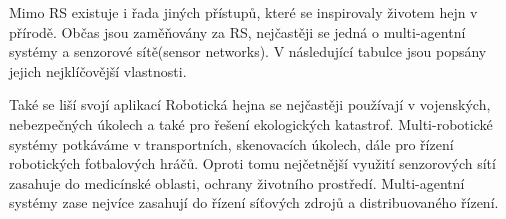 \par 
Mimo RS existuje i řada jiných přístupů, které se inspirovaly životem hejn v přírodě. Občas jsou zaměňovány za RS, nejčastěji se jedná o multi-agentní systémy a senzorové sítě(sensor networks). V následující tabulce jsou popsány jejich nejklíčovější vlastnosti. \par
\begin{center}
    \begin{table} 
    \end{table}
    \end{center}
    Také se liší svojí aplikací Robotická hejna se nejčastěji používají v vojenských, nebezpečných úkolech a také pro řešení ekologických katastrof. Multi-robotické systémy potkáváme v transportních, skenovacích úkolech, dále pro řízení robotických fotbalových hráčů. Oproti tomu nejčetnější využití senzorových sítí zasahuje do medicínské oblasti, ochrany životního prostředí. Multi-agentní systémy zase nejvíce zasahují do řízení síťových zdrojů a distribuovaného řízení. 
